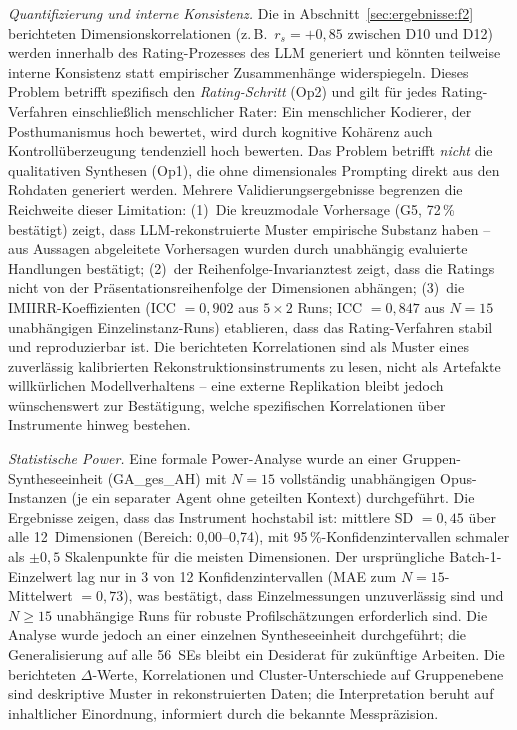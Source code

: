 \documentclass[12pt,a4paper]{article}
\begin{document}
\emph{Quantifizierung und interne Konsistenz.} Die in Abschnitt~\ref{sec:ergebnisse:f2} berichteten Dimensionskorrelationen (z.\,B.\ $r_s = +0{,}85$ zwischen D10 und D12) werden innerhalb des Rating-Prozesses des LLM generiert und k\"onnten teilweise interne Konsistenz statt empirischer Zusammenh\"ange widerspiegeln. Dieses Problem betrifft spezifisch den \emph{Rating-Schritt} (Op2) und gilt f\"ur jedes Rating-Verfahren einschlie\ss{}lich menschlicher Rater: Ein menschlicher Kodierer, der Posthumanismus hoch bewertet, wird durch kognitive Koh\"arenz auch Kontroll\"uberzeugung tendenziell hoch bewerten. Das Problem betrifft \emph{nicht} die qualitativen Synthesen (Op1), die ohne dimensionales Prompting direkt aus den Rohdaten generiert werden. Mehrere Validierungsergebnisse begrenzen die Reichweite dieser Limitation: (1)~Die kreuzmodale Vorhersage (G5, 72\,\% best\"atigt) zeigt, dass LLM-rekonstruierte Muster empirische Substanz haben -- aus Aussagen abgeleitete Vorhersagen wurden durch unabh\"angig evaluierte Handlungen best\"atigt; (2)~der Reihenfolge-Invarianztest zeigt, dass die Ratings nicht von der Pr\"asentationsreihenfolge der Dimensionen abh\"angen; (3)~die IMIIRR-Koeffizienten (ICC $= 0{,}902$ aus $5 \times 2$ Runs; ICC $= 0{,}847$ aus $N = 15$ unabh\"angigen Einzelinstanz-Runs) etablieren, dass das Rating-Verfahren stabil und reproduzierbar ist. Die berichteten Korrelationen sind als Muster eines zuverl\"assig kalibrierten Rekonstruktionsinstruments zu lesen, nicht als Artefakte willk\"urlichen Modellverhaltens -- eine externe Replikation bleibt jedoch w\"unschenswert zur Best\"atigung, welche spezifischen Korrelationen \"uber Instrumente hinweg bestehen.

\emph{Statistische Power.} Eine formale Power-Analyse wurde an einer Gruppen-Syntheseeinheit (GA\_ges\_AH) mit $N = 15$ vollst\"andig unabh\"angigen Opus-Instanzen (je ein separater Agent ohne geteilten Kontext) durchgef\"uhrt. Die Ergebnisse zeigen, dass das Instrument hochstabil ist: mittlere SD $= 0{,}45$ \"uber alle 12~Dimensionen (Bereich: 0,00--0,74), mit 95\,\%-Konfidenzintervallen schmaler als $\pm 0{,}5$ Skalenpunkte f\"ur die meisten Dimensionen. Der urspr\"ungliche Batch-1-Einzelwert lag nur in 3 von 12 Konfidenzintervallen (MAE zum $N = 15$-Mittelwert $= 0{,}73$), was best\"atigt, dass Einzelmessungen unzuverl\"assig sind und $N \geq 15$ unabh\"angige Runs f\"ur robuste Profilsch\"atzungen erforderlich sind. Die Analyse wurde jedoch an einer einzelnen Syntheseeinheit durchgef\"uhrt; die Generalisierung auf alle 56~SEs bleibt ein Desiderat f\"ur zuk\"unftige Arbeiten. Die berichteten $\Delta$-Werte, Korrelationen und Cluster-Unterschiede auf Gruppenebene sind deskriptive Muster in rekonstruierten Daten; die Interpretation beruht auf inhaltlicher Einordnung, informiert durch die bekannte Messpr\"azision.
\end{document}
